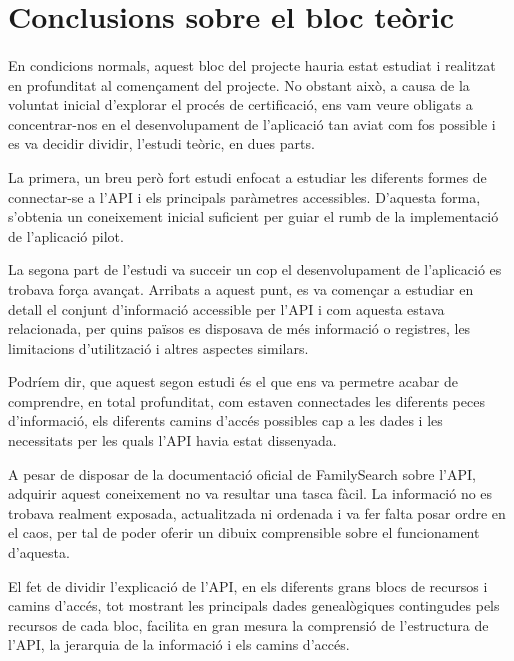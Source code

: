 \section{Conclusions sobre el bloc teòric}

    \paragraph{}

    En condicions normals, aquest bloc del projecte hauria estat estudiat i realitzat en profunditat al començament del projecte. No obstant això, a causa de la voluntat inicial d’explorar el procés de certificació, ens vam veure obligats a concentrar-nos en el desenvolupament de l’aplicació tan aviat com fos possible i es va decidir dividir, l’estudi teòric, en dues parts.

    La primera, un breu però fort estudi enfocat a estudiar les diferents formes de connectar-se a l’API i els principals paràmetres accessibles. D’aquesta forma, s’obtenia un coneixement inicial suficient per guiar el rumb de la implementació de l'aplicació pilot.

    La segona part de l’estudi va succeir un cop el desenvolupament de l’aplicació es trobava força avançat.  Arribats a aquest punt, es va començar a estudiar en detall el conjunt d’informació accessible per l’API i com aquesta estava relacionada, per quins països es disposava de més informació o registres, les limitacions d’utilització i altres aspectes similars.

    Podríem dir, que aquest segon estudi és el que ens va permetre acabar de comprendre, en total profunditat, com estaven connectades les diferents peces d’informació, els diferents camins d’accés possibles cap a les dades i les necessitats per les quals l’API havia estat dissenyada.

    A pesar de disposar de la documentació oficial de FamilySearch sobre l’API, adquirir aquest coneixement no va resultar una tasca fàcil. La informació no es trobava realment exposada, actualitzada ni ordenada i va fer falta posar ordre en el caos, per tal de poder oferir un dibuix comprensible sobre el funcionament d’aquesta.

    El fet de dividir l’explicació de l’API, en els diferents grans blocs de recursos i camins d’accés, tot mostrant les principals dades genealògiques contingudes pels recursos de cada bloc, facilita en gran mesura la comprensió de l’estructura de l’API, la jerarquia de la informació i els camins d’accés.

